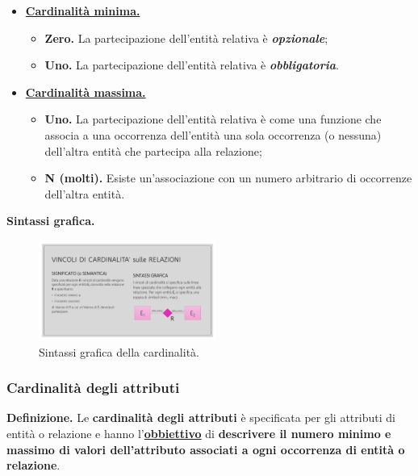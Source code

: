 \documentclass[a4paper]{article}
\begin{document}
	\begin{itemize}[label=]
		\item \textbf{\underline{Cardinalità minima.}}
		\begin{itemize}
			\item \textbf{Zero.} La partecipazione dell'entità relativa è \emph{\textbf{opzionale}};
			\item \textbf{Uno.} La partecipazione dell'entità relativa è \emph{\textbf{obbligatoria}}.
		\end{itemize}
	
		\item \textbf{\underline{Cardinalità massima.}}
		\begin{itemize}
			\item \textbf{Uno.} La partecipazione dell'entità relativa è come una funzione che associa a una occorrenza dell'entità una sola occorrenza (o nessuna) dell'altra entità che partecipa alla relazione;
			\item \textbf{N (molti).} Esiste un'associazione con un numero arbitrario di occorrenze dell'altra entità.
		\end{itemize}
	\end{itemize}

	\noindent
	\textcolor{Green4}{\textbf{Sintassi grafica.}}
	
	\begin{figure}[!htp]
		\centering
		\includegraphics[width=0.52\textwidth]{img/cardinalita_def.pdf}
		\caption{Sintassi grafica della cardinalità.}
	\end{figure}
	
	\newpage

	\subsubsection{Cardinalità degli attributi}
	
	\textcolor{Red3}{\textbf{Definizione.}} Le \textbf{cardinalità degli attributi} è specificata per gli attributi di entità o relazione e hanno l'\textbf{\underline{obbiettivo}} di \textbf{descrivere il numero minimo e massimo di valori dell'attributo associati a ogni occorrenza di entità o relazione}.\newline
	
\end{document}

